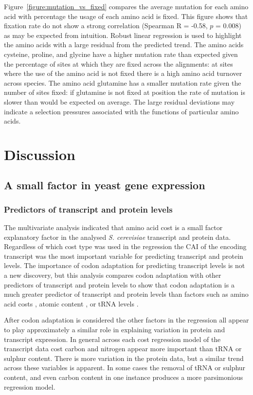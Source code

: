 Figure~\vref{figure:mutation_vs_fixed} compares the average mutation for each amino acid with percentage the usage of each amino acid is fixed. This figure shows that fixation rate do not show a strong correlation (Spearman R = -0.58, $p$ = 0.008) as may be expected from intuition. Robust linear regression is used to highlight the amino acids with a large residual from the predicted trend. The amino acids cysteine, proline, and glycine have a higher mutation rate than expected given the percentage of sites at which they are fixed across the alignments: at sites where the use of the amino acid is not fixed there is a high amino acid turnover across species. The amino acid glutamine has a smaller mutation rate given the number of sites fixed: if glutamine is not fixed at position the rate of mutation is slower than would be expected on average. The large residual deviations may indicate a selection pressures associated with the functions of particular amino acids.

\clearpage

\section{Discussion}

\subsection{A small factor in yeast gene expression}

\subsubsection{Predictors of transcript and protein levels}

The multivariate analysis indicated that amino acid cost is a small factor explanatory factor in the analysed \emph{S. cerevisiae} transcript and protein data. Regardless of which cost type was used in the regression the CAI of the encoding transcript was the most important variable for predicting transcript and protein levels. The importance of codon adaptation for predicting transcript levels is not a new discovery, but this analysis compares codon adaptation with other predictors of transcript and protein levels to show that codon adaptation is a much greater predictor of transcript and protein levels than factors such as amino acid costs \cite{akashi2002}, atomic content \cite{mazel1989,baudoin2001}, or tRNA levels \cite{akashi2003}.

After codon adaptation is considered the other factors in the regression all appear to play approximately a similar role in explaining variation in protein and transcript expression. In general across each cost regression model of the transcript data cost carbon and nitrogen appear more important than tRNA or sulphur content. There is more variation in the protein data, but a similar trend across these variables is apparent. In some cases the removal of tRNA or sulphur content, and even carbon content in one instance produces a more parsimonious regression model. 

